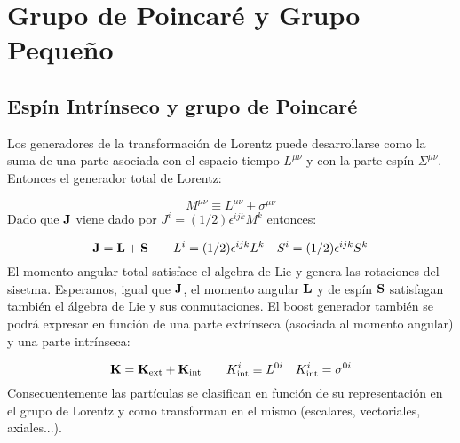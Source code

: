 \section{Grupo de Poincaré y Grupo Pequeño}

\subsection{Espín Intrínseco y grupo de Poincaré}

Los generadores de la transformación de Lorentz puede desarrollarse como la suma de una parte asociada con el espacio-tiempo $L^{\mu \nu}$ y con la parte espín $\Sigma^{\mu \nu}$. Entonces el generador total de Lorentz:

\begin{equation}
	M^{\mu \nu}\equiv L^{\mu \nu} + \sigma^{\mu \nu}
\end{equation}
Dado que $\mathbf{J}$ viene dado por $J^i=(1/2)\epsilon^{ijk}M^k$ entonces:

\begin{equation}
	\mathbf{J} = \mathbf{L} + \mathbf{S} \qquad L^i=(1/2)\epsilon^{ijk}L^k \quad S^i=(1/2)\epsilon^{ijk}S^k
\end{equation}
El momento angular total satisface el algebra de Lie y genera las rotaciones del sisetma. Esperamos, igual que $\mathbf{J}$, el momento angular $\mathbf{L}$ y de espín $\mathbf{S}$ satisfagan también el álgebra de Lie y sus conmutaciones. El boost generador también se podrá expresar en función de una parte extrínseca (asociada al momento angular) y una parte intrínseca:

\begin{equation}
	\mathbf{K} = \mathbf{K}_{\text{ext}} +  \mathbf{K}_{\text{int}} \qquad  K_{\text{int}}^i \equiv L^{0i} \quad K_{\text{int}}^i = \sigma^{0i}
 \end{equation} 
Consecuentemente las partículas se clasifican en función de su representación en el grupo de Lorentz y como transforman en el mismo (escalares, vectoriales, axiales...). 
